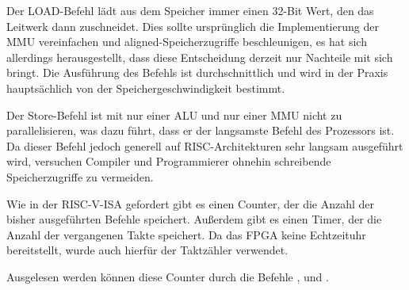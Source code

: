 Der LOAD-Befehl l\"adt aus dem Speicher immer einen 32-Bit Wert, den das
Leitwerk dann zuschneidet. Dies sollte urspr\"unglich die Implementierung der
MMU vereinfachen und aligned-Speicherzugriffe beschleunigen, es hat sich
allerdings herausgestellt, dass diese Entscheidung derzeit nur Nachteile mit
sich bringt. Die Ausf\"uhrung des Befehls ist durchschnittlich und wird in der
Praxis haupts\"achlich von der Speichergeschwindigkeit bestimmt.


Der Store-Befehl ist mit nur einer ALU und nur einer MMU nicht zu
parallelisieren, was dazu f\"uhrt, dass er der langsamste Befehl des Prozessors
ist. Da dieser Befehl jedoch generell auf RISC-Architekturen sehr langsam
ausgef\"uhrt wird, versuchen Compiler und Programmierer ohnehin
schreibende Speicherzugriffe zu vermeiden.


Wie in der RISC-V-ISA gefordert gibt es einen Counter, der die Anzahl der
bisher ausgef\"uhrten Befehle speichert. Au\ss{}erdem gibt es einen Timer, der
die Anzahl der vergangenen Takte speichert. Da das FPGA keine Echtzeituhr
bereitstellt, wurde auch hierf\"ur der Taktz\"ahler verwendet.

Ausgelesen werden k\"onnen diese Counter durch die Befehle
\nolinebreak{},  und .


